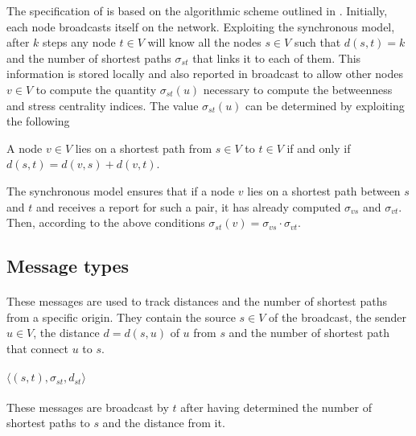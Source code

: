 
\newcommand{\mdecrepargs}[2]{\mrep$\langle (#1,#2), \sigma_{#1 #2}, d_{#1 #2}\rangle$}
\newcommand{\mdecrepargsfull}[3]{\mrep$\langle (#1,#2), \sigma_{#1 #2}, #3\rangle$}

The specification of \deccen{} is based on the algorithmic scheme outlined in \cite{lehmann2003}. Initially, each node broadcasts itself on the network. Exploiting the synchronous model, after $k$ steps any node $t \in V$ will know all the nodes $s \in V$ such that $d(s,t) = k$ and the number of shortest paths  $\sigma_{st}$ that links it to each of them. This information is stored locally and also reported in broadcast to allow other nodes $v \in V$ to compute the quantity $\sigma_{st}(u)$ necessary to compute the betweenness and stress centrality indices. The value $\sigma_{st}(u)$ can be determined by exploiting the following

\begin{lemma}
A node $v \in V$ lies on a shortest path from $s \in V$ to $t \in V$ if and only if $d(s,t) = d(v,s) + d(v,t)$.
\end{lemma}

The synchronous model ensures that if a node $v$ lies on a shortest path between $s$ and $t$ and receives a report for such a pair, it has already computed $\sigma_{vs}$ and $\sigma_{vt}$. Then, according to the above conditions $\sigma_{st}(v) = \sigma_{vs} \cdot \sigma_{vt}$.

\subsection{Message types}

\paragraph{} These messages are used to track distances and the number of shortest paths from a specific origin. They contain the source $s \in V$ of the broadcast, the sender $u \in V$, the distance $d = d(s,u)$ of $u$ from $s$ and the number of shortest path that connect $u$ to $s$.

\paragraph{\mdecrepargs{s}{t}} These messages are broadcast by $t$ after having determined the number of shortest paths to $s$ and the distance from it.

